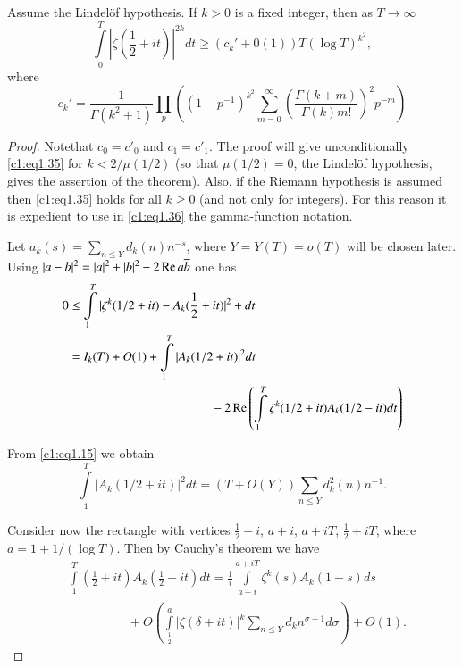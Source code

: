 \begin{thm}\label{c1:thm1.5}
  Assume the Lindel\"of hypothesis. If $k > 0$ is a fixed integer,
  then as $T \to \infty$ 
  \begin{equation}
    \int\limits_0^T \left|\zeta \left( \frac{1}{2} + it \right)\right|^{2k}
    dt \geq (c_k' + 0(1)) T (\log T)^{k^2}, \label{c1:eq1.35}
  \end{equation}
  where 
  \begin{equation}
    c_k' = \frac{1}{\Gamma(k^2+1)} \prod\limits_p \left((1- p^{-1})^{k^2}
    \sum^\infty_{m=0} \left(\frac{\Gamma (k+m)}{\Gamma (k) m!}
    \right)^2 p^{-m}\right)\label{c1:eq1.36}
  \end{equation}
\end{thm}

\begin{proof}
  Note\pageoriginale that $c_0 = c'_0$ and $c_1 = c'_1$. The proof will give
  unconditionally \eqref{c1:eq1.35} for $k < 2/\mu (1/2)$ (so that
  $\mu(1/2)=0$, the Lindel\"of hypothesis, gives the assertion of the
  theorem). Also, if the Riemann hypothesis is assumed then
  \eqref{c1:eq1.35} holds for all $k \geq 0$ (and not only for
  integers). For this reason it is expedient to use in
  \eqref{c1:eq1.36} the gamma-function notation.

  Let $a_k (s) = \displaystyle{\sum_{n \leq Y} d_k (n) n^{-s}}$, where
    $Y= Y(T)= o (T)$ will be chosen later. Using $|a-b|^2= |a|^2+
    |b|^2- 2 \operatorname{Re} a \overline{b}$ one has
    \begin{align*}
      0 & \leq \int\limits^T_1 |\zeta^k (1/2+ it )- A_k (\frac{1}{2} + it ) |^2 +
       dt\\
      & = I_k (T) + O(1) + \int\limits^T_1 |A_k (1/2+ it )|^2
      dt\\ 
      & \hspace{4cm}-
      2 \re \left( \int\limits^T_1 \zeta^k (1/2 + it ) A_k (1/2 -
      it ) dt \right)
    \end{align*}

From \eqref{c1:eq1.15} we obtain
\begin{equation}
  \int\limits^T_1 |A_k (1/2 + it )|^2 dt = (T + O (Y))
  \sum\limits_{n \leq Y} d^2_k (n) n^{-1}.\label{c1:eq1.37}
\end{equation}

Consider now the rectangle with vertices $\frac{1}{2} + i$, $a+i$, $a+
iT$, $\frac{1}{2} + iT$, where $a=1+ 1/(\log T)$. Then by Cauchy's
theorem we have
\begin{align*}
& \int\limits_1^T \left(\frac{1}{2} + it   \right) A_k
\left(\frac{1}{2}- it \right) dt = \frac{1}{i} \int\limits_{a+i}^{a+ iT} \zeta^k (s) A_k (1-s) ds\\
&\hspace{2cm} + O \left( \int\limits_{\frac{1}{2}}^a  |\zeta (\delta + it)|^k \sum_{n
  \leq Y} d_k n^{\sigma-1} d \sigma\right)+ O(1).
\end{align*}


\end{proof}
